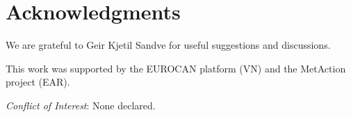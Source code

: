 \documentclass{bio}
\begin{document}
\section*{Acknowledgments}

We are grateful to Geir Kjetil Sandve for useful suggestions and discussions. 

This work was supported by the EUROCAN platform (VN) and the MetAction project (EAR).

{\it Conflict of Interest}: None declared.



%


\end{document}
